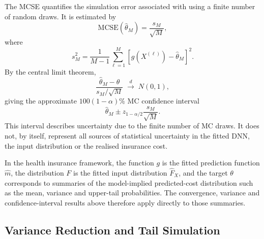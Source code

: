 \noindent
The MCSE quantifies the simulation error associated with
using a finite number of random draws. It is estimated by
\begin{equation}
\label{eq:mcse}
    \mathrm{MCSE}
    \!\left(
        \widehat{\theta}_{M}
    \right)
    =
    \frac{s_M}{\sqrt{M}},
\end{equation}
where
\begin{equation}
\label{eq:mc_sample_variance}
    s_M^2
    =
    \frac{1}{M-1}
    \sum_{\ell=1}^{M}
    \left[
        g
        \!\left(
            X^{(\ell)}
        \right)
        -
        \widehat{\theta}_{M}
    \right]^2.
\end{equation}
By the central limit theorem,
\begin{equation}
\label{eq:mc_clt}
    \frac{
        \widehat{\theta}_{M}
        -
        \theta
    }{
        s_M/\sqrt{M}
    }
    \;
    \overset{d}{\longrightarrow}
    \;
    N(0,1),
\end{equation}
giving the approximate \(100(1-\alpha)\%\) MC confidence interval
\begin{equation}
\label{eq:mc_ci}
    \widehat{\theta}_{M}
    \pm
    z_{1-\alpha/2}
    \frac{s_M}{\sqrt{M}}.
\end{equation}
This interval describes uncertainty due to the finite number of MC
draws. It does not, by itself, represent all sources of statistical uncertainty
in the fitted DNN, the input distribution or the realised insurance cost.

\noindent
In the health insurance framework, the function \(g\) is
the fitted prediction function \(\widehat{m}\), the distribution \(F\) is the
fitted input distribution \(\widehat{F}_{X}\), and the target
\(\theta\) corresponds to summaries of the model-implied predicted-cost
distribution such as the mean, variance and upper-tail probabilities. The
convergence, variance and confidence-interval results above therefore apply
directly to those summaries.


\subsection{Variance Reduction and Tail Simulation}
\label{sec:variance_reduction_tail_simulation}

